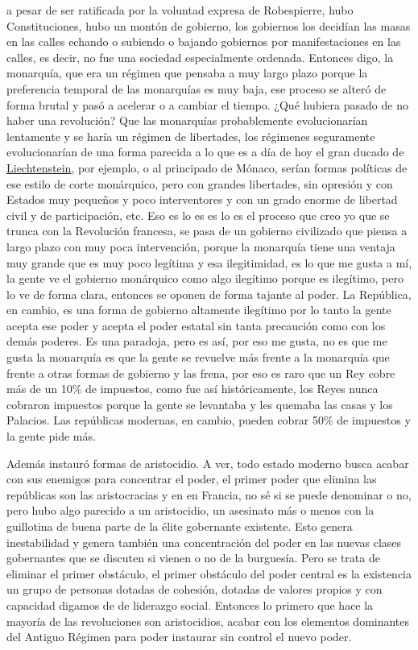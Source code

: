 a pesar de ser ratificada por la voluntad expresa de Robespierre, hubo Constituciones, hubo un montón de gobierno, los gobiernos los decidían las masas en las calles echando o subiendo o bajando gobiernos por manifestaciones en las calles, es decir, no fue una sociedad especialmente ordenada. Entonces digo, la monarquía, que era un régimen que pensaba a muy largo plazo porque la preferencia temporal de las monarquías es muy baja, ese proceso se alteró de forma brutal y pasó a acelerar o a cambiar el tiempo. ¿Qué hubiera pasado de no haber una revolución? Que las monarquías probablemente evolucionarían lentamente y se haría un régimen de libertades, los régimenes seguramente evolucionarían de una forma parecida a lo que es a día de hoy el gran ducado de \href{https://en.wikipedia.org/wiki/Liechtenstein}{Liechtenstein}, por ejemplo, o al principado de Mónaco, serían formas políticas de ese estilo de corte monárquico, pero con grandes libertades, sin opresión y con Estados muy pequeños y poco interventores y con un grado enorme de libertad civil y de participación, etc. Eso es lo es es lo es el proceso que creo yo que se trunca con la Revolución francesa, se pasa de un gobierno civilizado que piensa a largo plazo con muy poca intervención, porque la monarquía tiene una ventaja muy grande que es muy poco legítima y esa ilegitimidad, es lo que me gusta a mí, la gente ve el gobierno monárquico como algo ilegítimo porque es ilegítimo, pero lo ve de forma clara, entonces se oponen de forma tajante al poder. La República, en cambio, es una forma de gobierno altamente ilegítimo por lo tanto la gente acepta ese poder y acepta el poder estatal sin tanta precaución como con los demás poderes. Es una paradoja, pero es así, por eso me gusta, no es que me gusta la monarquía es que la gente se revuelve más frente a la monarquía que frente a otras formas de gobierno y las frena, por eso es raro que un Rey cobre más de un 10\% de impuestos, como fue así históricamente, los Reyes nunca cobraron impuestos porque la gente se levantaba y les quemaba las casas y los Palacios. Las repúblicas modernas, en cambio, pueden cobrar 50\% de impuestos y la gente pide más.

Además instauró formas de aristocidio. A ver, todo estado moderno busca acabar con sus enemigos para concentrar el poder, el primer poder que elimina las repúblicas son las aristocracias y en en Francia, no sé si se puede denominar o no, pero hubo algo parecido a un aristocidio, un asesinato más o menos con la guillotina de buena parte de la élite gobernante existente. Esto genera inestabilidad y genera también una concentración del poder en las nuevas clases gobernantes que se discuten si vienen o no de la burguesía. Pero se trata de eliminar el primer obstáculo, el primer obstáculo del poder central es la existencia un grupo de personas dotadas de cohesión, dotadas de valores propios y con capacidad digamos de de liderazgo social. Entonces lo primero que hace la mayoría de las revoluciones son aristocidios, acabar con los elementos dominantes del Antiguo Régimen
para poder instaurar sin control el nuevo poder.

